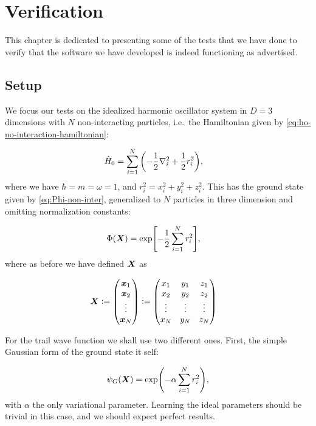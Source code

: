 \documentclass[Thesis.tex]{subfiles}
\begin{document}
\chapter{Verification}
\label{chp:verfication}

This chapter is dedicated to presenting some of the tests that we have done to
verify that the software we have developed is indeed functioning as advertised.

\section{Setup}

We focus our tests on the idealized harmonic oscillator system in $D = 3$ dimensions
with $N$ non-interacting particles, i.e.\ the Hamiltonian given by
\cref{eq:ho-no-interaction-hamiltonian}:

\begin{align}
    \hat H_0 &= \sum_{i=1}^N\qty(-\frac{1}{2}\laplacian_i +
    \frac{1}{2}r_i^2),
\end{align}
where we have $\hbar = m = \omega = 1$, and
$r_i^2 = x_i^2 + y_i^2+z_i^2$. This has the ground state given by
\cref{eq:Phi-non-inter}, generalized to $N$ particles in three dimension and
omitting normalization constants:

\begin{align}
        \Phi(\bm{X}) &= \exp[-\frac{1}{2}\sum_{i=1}^N r_i^2],
\end{align}
where as before we have defined $\bm{X}$ as

\begin{align}
  \mat X &\defeq \mqty(\vx_1\\\vx_2\\\vdots\\\vx_N) \defeq \mqty(x_1&y_1&z_1\\x_2&y_2&z_2\\\vdots&\vdots&\vdots\\x_N&y_N&z_N)
\end{align}

For the trail wave function we shall use two different ones. First, the simple
Gaussian form of the ground state it self:

\begin{align}
  \psi_G(\bm{X}) = \exp(-\alpha\sum_{i = 1}^N r_i^2),
\end{align}
with $\alpha$ the only variational parameter. Learning the ideal parameters
should be trivial in this case, and we should expect perfect results.
\end{document}
